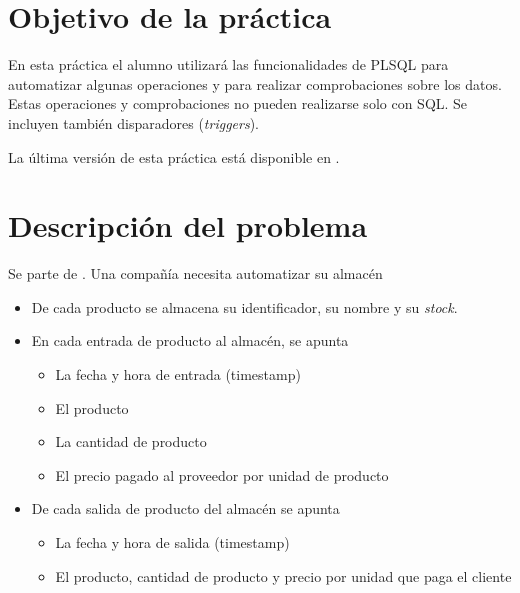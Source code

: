 
\usepackage{needspace}




\renewcommand{\hmwkTitle}{Práctica PLSQL con triggers}
\renewcommand{\hmwkClass}{Gestión de Bases de datos}







\primerapagina


\section{Objetivo de la práctica}
En esta práctica el alumno utilizará las funcionalidades de PLSQL para automatizar algunas operaciones y para realizar comprobaciones sobre los datos. Estas operaciones y comprobaciones no pueden realizarse solo con SQL. Se incluyen también disparadores (\textit{triggers}).

La última versión de esta práctica está disponible en .


\section{Descripción del problema}
Se parte de . Una compañía necesita automatizar su almacén
\begin{itemize}
\item De cada producto se almacena su identificador, su nombre y su \textit{stock}.
\item En cada entrada de producto al almacén, se apunta
  \begin{itemize}
  \item La fecha y hora de entrada (timestamp)
  \item El producto
  \item La cantidad de producto
  \item El precio pagado al proveedor por unidad de producto
  \end{itemize}
\item De cada salida de producto del almacén se apunta
  \begin{itemize}
  \item La fecha y hora de salida (timestamp)
  \item El producto, cantidad de producto y precio por unidad que paga el cliente
  \end{itemize}
\end{itemize}

